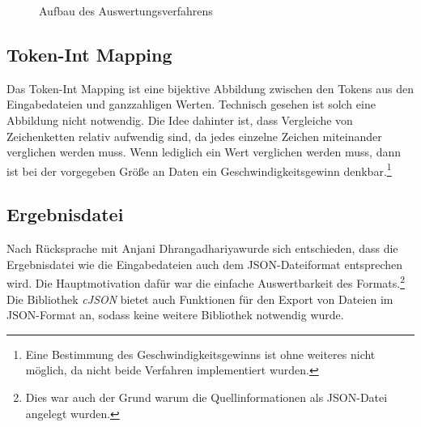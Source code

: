 \documentclass[a4paper,10pt]{article}
\newcommand{\dashAndSpace}[0]{\textendash \space}
\newcommand{\dataSource}[0]{Anjani Dhrangadhariya}
\begin{document}
\begin{figure}[H]
            \caption{Aufbau des Auswertungsverfahrens}
            \label{Proammverfahren}
        \end{figure}

    \subsection{Token-Int Mapping}
        Das Token-Int Mapping ist eine bijektive Abbildung zwischen den Tokens aus den Eingabedateien und ganzzahligen Werten. Technisch gesehen ist solch eine Abbildung nicht notwendig. Die Idee dahinter ist, dass Vergleiche von Zeichenketten relativ aufwendig sind, da jedes einzelne Zeichen miteinander verglichen werden muss. Wenn lediglich ein Wert verglichen werden muss, dann ist bei der vorgegeben Größe an Daten ein Geschwindigkeitsgewinn denkbar.\footnote{Eine Bestimmung des Geschwindigkeitsgewinns ist ohne weiteres nicht möglich, da nicht beide Verfahren implementiert wurden.}

    \subsection{Ergebnisdatei}
        Nach Rücksprache mit \dataSource \space wurde sich entschieden, dass die Ergebnisdatei \dashAndSpace wie die Eingabedateien \dashAndSpace auch dem JSON-Dateiformat entsprechen wird. Die Hauptmotivation dafür war die einfache Auswertbarkeit des Formats.\footnote{Dies war auch der Grund warum die Quellinformationen als JSON-Datei angelegt wurden.}
        Die Bibliothek \emph{cJSON} bietet auch Funktionen für den Export von Dateien im JSON-Format an, sodass keine weitere Bibliothek notwendig wurde.
\end{document}
